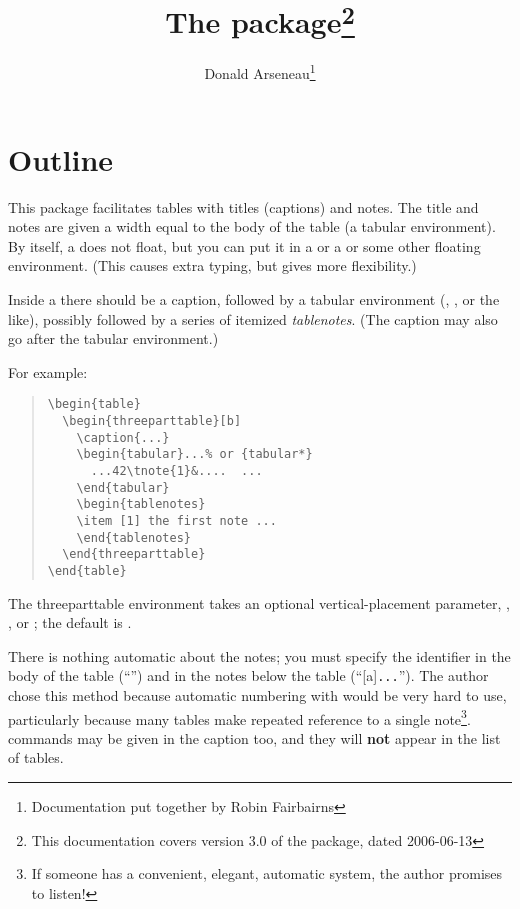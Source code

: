\documentclass[a4paper]{article}
\begin{document}
\title{The  package\thanks{This documentation
    covers version 3.0 of the package, dated 2006-06-13}}
\author{Donald Arseneau\thanks{Documentation put together by Robin
    Fairbairns}}
\maketitle

\section{Outline}

This package facilitates tables with titles (captions) and notes.  The
title and notes are given a width equal to the body of the table (a
tabular environment).  By itself, a  does
not float, but you can put it in a  or a
 or some other floating environment.  (This causes
extra typing, but gives more flexibility.)

Inside a  there should be a caption,
followed by a tabular environment (,
,  or the like), possibly
followed by a series of itemized \emph{tablenotes}.  (The caption may
also go after the tabular environment.)

For example:
\begin{quote}
\begin{verbatim}
\begin{table}
  \begin{threeparttable}[b]
    \caption{...}
    \begin{tabular}...% or {tabular*}
      ...42\tnote{1}&....  ...
    \end{tabular}
    \begin{tablenotes}
    \item [1] the first note ...
    \end{tablenotes}
  \end{threeparttable}
\end{table}
\end{verbatim}
\end{quote}

The {threeparttable} environment takes an optional vertical-placement
parameter, \option[t], \option[b], or \option[c]; the default is
\option[t].

There is nothing automatic about the notes; you must specify the
identifier in the body of the table (``'') and in
the notes below the table (``[a]\texttt{...}'').  The
author chose this method because automatic numbering with  would be very hard to use, particularly because many tables make
repeated reference to a single note\footnote{If someone has a
  convenient, elegant, automatic system, the author promises to
  listen!}.   commands may be given in the caption too, and
they will \textbf{not} appear in the list of tables.
\end{document}
